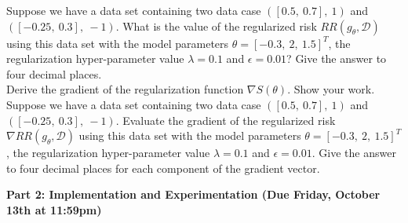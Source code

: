 \documentclass[11pt]{article}
\begin{document}
\begin{problem}{20}
 Suppose we have a data set containing two data case $([0.5,~0.7],~1)$ and $([-0.25,~0.3],~-1)$. What is the value of the regularized risk $RR(g_{\theta},\mathcal{D})$ using this data set with the model parameters $\theta=[-0.3,~2,~1.5]^T$, the regularization hyper-parameter value  $\lambda=0.1$ and $\epsilon = 0.01$? Give the answer to four decimal places.\\

 Derive the gradient of the regularization function $\nabla S(\theta)$. Show your work.\\

 Suppose we have a data set containing two data case $([0.5,~0.7],~1)$ and $([-0.25,~0.3],~-1)$. Evaluate the gradient of the regularized risk $\nabla RR(g_{\theta},\mathcal{D})$ using this data set with the model parameters $\theta=[-0.3,~2,~1.5]^T$, the regularization hyper-parameter value  $\lambda=0.1$ and $\epsilon = 0.01$. Give the answer to four decimal places for each component of the gradient vector.

\end{problem}

\vspace{1em}
\textbf{Part 2: Implementation and Experimentation (Due Friday, October 13th at 11:59pm)}
\end{document}
